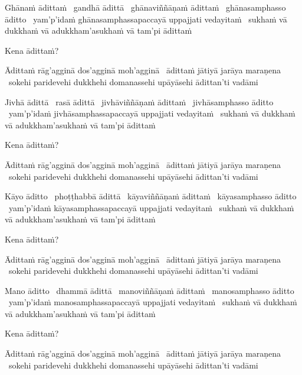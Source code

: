 \begin{pali-hang}
  Ghānaṁ ādittaṁ \breathmark\ gandhā ādittā \breathmark\ ghānaviññāṇaṁ ādittaṁ \breathmark\ ghānasamphasso āditto \breathmark\ yam'p'idaṁ ghānasamphassapaccayā uppajjati vedayitaṁ \breathmark\ sukhaṁ vā dukkhaṁ vā adukkham'asukhaṁ vā tam'pi ādittaṁ
\end{pali-hang}
\begin{pali-hangtogether}
Kena ādittaṁ?
\end{pali-hangtogether}
\begin{pali-hangtogether}
  Ādittaṁ rāg'agginā dos'agginā moh'agginā \breathmark\ ādittaṁ jātiyā jarāya maraṇena \breathmark\ sokehi paridevehi dukkhehi domanassehi upāyāsehi ādittan'ti vadāmi
\end{pali-hangtogether}

\begin{pali-hang}
  Jivhā ādittā \breathmark\ rasā ādittā \breathmark\ jivhāviññāṇaṁ ādittaṁ \breathmark\ jivhāsamphasso āditto \breathmark\ yam'p'idaṁ jivhāsamphassapaccayā uppajjati vedayitaṁ \breathmark\ sukhaṁ vā dukkhaṁ vā adukkham'asukhaṁ vā tam'pi ādittaṁ
\end{pali-hang}
\begin{pali-hangtogether}
Kena ādittaṁ?
\end{pali-hangtogether}
\begin{pali-hangtogether}
  Ādittaṁ rāg'agginā dos'agginā moh'agginā \breathmark\ ādittaṁ jātiyā jarāya maraṇena \breathmark\ sokehi paridevehi dukkhehi domanassehi upāyāsehi ādittan'ti vadāmi
\end{pali-hangtogether}

\begin{pali-hang}
  Kāyo āditto \breathmark\ phoṭṭhabbā ādittā \breathmark\ kāyaviññāṇaṁ ādittaṁ \breathmark\ kāyasamphasso āditto \breathmark\ yam'p'idaṁ kāyasamphassapaccayā uppajjati vedayitaṁ \breathmark\ sukhaṁ vā dukkhaṁ vā adukkham'asukhaṁ vā tam'pi ādittaṁ
\end{pali-hang}
\begin{pali-hangtogether}
Kena ādittaṁ?
\end{pali-hangtogether}
\begin{pali-hangtogether}
  Ādittaṁ rāg'agginā dos'agginā moh'agginā \breathmark\ ādittaṁ jātiyā jarāya maraṇena \breathmark\ sokehi paridevehi dukkhehi domanassehi upāyāsehi ādittan'ti vadāmi
\end{pali-hangtogether}

\begin{pali-hang}
  Mano āditto \breathmark\ dhammā ādittā \breathmark\ manoviññāṇaṁ ādittaṁ \breathmark\ manosamphasso āditto \breathmark\ yam'p'idaṁ manosamphassapaccayā uppajjati vedayitaṁ \breathmark\ sukhaṁ vā dukkhaṁ vā adukkham'asukhaṁ vā tam'pi ādittaṁ
\end{pali-hang}
\begin{pali-hangtogether}
Kena ādittaṁ?
\end{pali-hangtogether}
\begin{pali-hangtogether}
  Ādittaṁ rāg'agginā dos'agginā moh'agginā \breathmark\ ādittaṁ jātiyā jarāya maraṇena \breathmark\ sokehi paridevehi dukkhehi domanassehi upāyāsehi ādittan'ti vadāmi
\end{pali-hangtogether}

